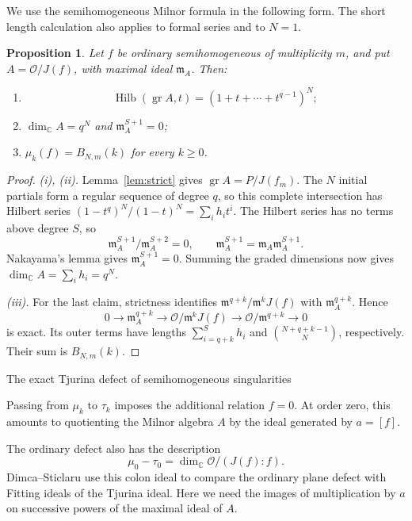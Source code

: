 \documentclass[12pt,reqno]{amsart}
\makeatletter
\renewcommand\subsection{\@startsection{subsection}{2}%
  \z@{.8\linespacing\@plus.3\linespacing}{.35\linespacing}%
  {\normalfont\bfseries}}
\newcommand{\C}{\mathbb C}
\newcommand{\mm}{\mathfrak m}
\newcommand{\gr}{\operatorname{gr}}
\newcommand{\Hilb}{\operatorname{Hilb}}
\newcommand{\OO}{\mathcal O}
\newtheorem{proposition}[theorem]{Proposition}
\theoremstyle{definition}
\makeatother
\begin{document}
We use the semihomogeneous Milnor formula
\cite[Propositions~3.1 and~4.1]{LiuYauZhang2026} in the following
form. The short length calculation also applies to formal series
and to $N=1$.


\begin{proposition}\label{prop:ordinarymu}
Let $f$ be ordinary semihomogeneous of multiplicity $m$, and put
$A=\OO/J(f)$, with maximal ideal $\mm_A$. Then:
\begin{enumerate}
\item \begin{equation}\label{eq:ordinaryA}
 \Hilb(\gr A,t)=(1+t+\cdots+t^{q-1})^N;
\end{equation}
\item $\dim_\C A=q^N$ and $\mm_A^{S+1}=0$;
\item $\mu_k(f)=B_{N,m}(k)$ for every $k\geq0$.
\end{enumerate}
\end{proposition}
\begin{proof}
\emph{(i), (ii).}
Lemma~\ref{lem:strict} gives $\gr A=P/J(f_m)$.
The $N$ initial partials form a regular sequence of degree $q$,
so this complete intersection has Hilbert series
$(1-t^q)^N/(1-t)^N=\sum_i h_it^i$.
The Hilbert series has no terms above degree $S$, so
\[
 \mm_A^{S+1}/\mm_A^{S+2}=0,\qquad
 \mm_A^{S+1}=\mm_A\mm_A^{S+1}.
\]
Nakayama's lemma gives $\mm_A^{S+1}=0$.
Summing the graded dimensions now gives
$\dim_\C A=\sum_i h_i=q^N$.


\emph{(iii).}
For the last claim, strictness identifies
$\mm^{q+k}/\mm^kJ(f)$ with $\mm_A^{q+k}$. Hence
\[
 0\longrightarrow\mm_A^{q+k}
 \longrightarrow\OO/\mm^kJ(f)
 \longrightarrow\OO/\mm^{q+k}\longrightarrow0
\]
is exact. Its outer terms have lengths
$\sum_{i=q+k}^S h_i$ and $\binom{N+q+k-1}{N}$, respectively.
Their sum is $B_{N,m}(k)$.
\end{proof}


\subsection{The exact Tjurina defect of semihomogeneous singularities}

Passing from $\mu_k$ to $\tau_k$ imposes the additional relation
$f=0$. At order zero, this amounts to quotienting the Milnor algebra
$A$ by the ideal generated by $a=[f]$.

 The ordinary defect also has the description
\[ 
\mu_0-\tau_0=\dim_\C \OO/(J(f):f).\]
Dimca--Sticlaru \cite[\S3]{DimcaSticlaru2026} use this colon ideal
to compare the ordinary plane defect with Fitting ideals of the
Tjurina ideal. Here we need the images of multiplication by $a$
on successive powers of the maximal ideal of $A$. 
\end{document}
